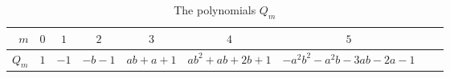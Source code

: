 \documentclass[10pt,a4paper]{amsart}
\theoremstyle{definition}
\begin{document}
\begin{table}[ht]
\renewcommand{\arraystretch}{1.2}
\begin{tabular}{|r||c|c|c|c|c|c|c|c|}
\hline
$m$&$0$&$1$&$2$&$3$&$4$&$5$\\\hline\hline
$Q_m$&	{\small$1$}	&{\small$-1$}	&{\small$-b-1$}&{\small$ab+a+1$}&{\small$ab^2+ab+2b+1$}&{\small$-a^2b^2-a^2b-3ab-2a-1$}	\\\hline
\end{tabular} \\[3pt]
\caption{The polynomials $Q_m$}
\label{qm table}
\end{table}
\end{document}
